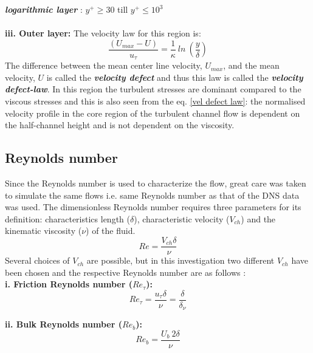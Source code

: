 \emph{\textbf{logarithmic layer}} : $y^+ \geq  30$ till $y^+ \leq  10^3$ \\\\
%
\textbf{iii. Outer layer:} The velocity law for this region is:
\begin{equation}
	\label{vel defect law}
	\frac{\left(U_{max} - U\right)}{u_\tau} = \frac{1}{\kappa}\ ln\ \left(\frac{y}{\delta}\right)  
\end{equation}
The difference between the mean center line velocity, $U_{max}$, and the mean velocity, $U$ is called the \emph{\textbf{velocity defect}} and thus this law is called the \emph{\textbf{velocity defect-law}}. In this region the turbulent stresses are dominant compared to the viscous stresses and this is also seen from the eq. \ref{vel defect law}: the normalised velocity profile in the core region of the turbulent channel flow is dependent on the half-channel height and is not dependent on the viscosity. 

\subsection{Reynolds number}
Since the Reynolds number is used to characterize the flow, great care was taken to simulate the same flows i.e. same Reynolds number as that of the DNS data was used. The dimensionless Reynolds number requires three parameters for its definition: characteristics length ($\delta$), characteristic velocity ($V_{ch}$) and the kinematic viscosity ($\nu$) of the fluid. 
$$ Re = \frac{V_{ch}\delta}{\nu} $$
Several choices of $V_{ch}$ are possible, but in this investigation two different $V_{ch}$ have been chosen and the respective Reynolds number are as follows :\\

\textbf{i. Friction Reynolds number ($Re_\tau$):}\begin{equation}
	\label{friction Re}
	Re_\tau = \frac{u_\tau \delta}{\nu}  = \frac{\delta}{\delta_\nu}  
\end{equation}

\textbf{ii. Bulk Reynolds number ($Re_b$):}\begin{equation}
	\label{bulk Re}
	Re_b = \frac{U_b\ 2\delta}{\nu}
\end{equation}

